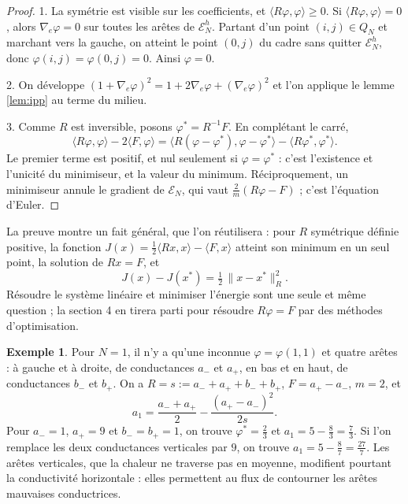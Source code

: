 \documentclass[11pt,a4paper]{article}
\theoremstyle{plain}
\theoremstyle{definition}
\newtheorem{exemple}[theoreme]{Exemple}
\theoremstyle{remark}
\newcommand{\E}{\mathcal{E}}
\newcommand{\ps}[2]{\langle #1,#2\rangle}
\begin{document}
\begin{proof}
1. La symétrie est visible sur les coefficients, et $\ps{R\varphi}{\varphi}\geq0$. Si $\ps{R\varphi}{\varphi}=0$, alors $\nabla_e\varphi=0$ sur toutes les arêtes de $\E^h_N$. Partant d'un point $(i,j)\in Q_N$ et marchant vers la gauche, on atteint le point $(0,j)$ du cadre sans quitter $\E^h_N$, donc $\varphi(i,j)=\varphi(0,j)=0$. Ainsi $\varphi=0$.

2. On développe $(1+\nabla_e\varphi)^2=1+2\nabla_e\varphi+(\nabla_e\varphi)^2$ et l'on applique le lemme \ref{lem:ipp} au terme du milieu.

3. Comme $R$ est inversible, posons $\varphi^*=R^{-1}F$. En complétant le carré,
\[
  \ps{R\varphi}{\varphi}-2\ps{F}{\varphi}=\ps{R(\varphi-\varphi^*)}{\varphi-\varphi^*}-\ps{R\varphi^*}{\varphi^*} .
\]
Le premier terme est positif, et nul seulement si $\varphi=\varphi^*$ : c'est l'existence et l'unicité du minimiseur, et la valeur du minimum. Réciproquement, un minimiseur annule le gradient de $\E_N$, qui vaut $\frac2m(R\varphi-F)$ ; c'est l'équation d'Euler.
\end{proof}

La preuve montre un fait général, que l'on réutilisera : pour $R$ symétrique définie positive, la fonction $J(x)=\frac12\ps{Rx}{x}-\ps{F}{x}$ atteint son minimum en un seul point, la solution de $Rx=F$, et
\begin{equation}\label{eq:energie}
  J(x)-J(x^*)=\tfrac12\,\|x-x^*\|_R^2 .
\end{equation}
Résoudre le système linéaire et minimiser l'énergie sont une seule et même question ; la section 4 en tirera parti pour résoudre $R\varphi=F$ par des méthodes d'optimisation.

\begin{exemple}\label{ex:un}
Pour $N=1$, il n'y a qu'une inconnue $\varphi=\varphi(1,1)$ et quatre arêtes : à gauche et à droite, de conductances $a_-$ et $a_+$, en bas et en haut, de conductances $b_-$ et $b_+$. On a $R=s:=a_-+a_++b_-+b_+$, $F=a_+-a_-$, $m=2$, et
\[
  a_1=\frac{a_-+a_+}2-\frac{(a_+-a_-)^2}{2s}.
\]
Pour $a_-=1$, $a_+=9$ et $b_-=b_+=1$, on trouve $\varphi^*=\frac23$ et $a_1=5-\frac83=\frac73$. Si l'on remplace les deux conductances verticales par $9$, on trouve $a_1=5-\frac87=\frac{27}7$. Les arêtes verticales, que la chaleur ne traverse pas en moyenne, modifient pourtant la conductivité horizontale : elles permettent au flux de contourner les arêtes mauvaises conductrices.
\end{exemple}
\end{document}
